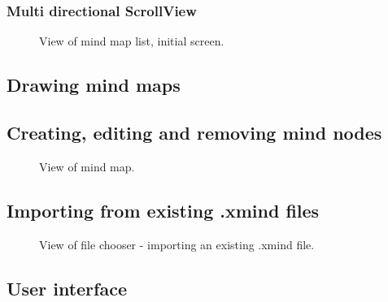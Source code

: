 \subsubsection{Multi directional ScrollView}
\label{subsubsec:action-bar}


\begin{figure}[h]
	\centering
	\caption{View of mind map list, initial screen.}
	\label{fig:screen-maplist}
\end{figure}

\subsection{Drawing mind maps}
\label{subsec:drawing}

\subsection{Creating, editing and removing mind nodes}
\label{subsec:drawing}

\begin{figure}[h]
	\centering
	\caption{View of mind map.}
	\label{fig:screen-map}
\end{figure}

\subsection{Importing from existing .xmind files}
\label{subsec:import}

\begin{figure}[h]
	\centering
	\caption{View of file chooser - importing an existing .xmind file.}
	\label{fig:screen-filechooser}
\end{figure}


\subsection{User interface}
\label{subsec:ui}
